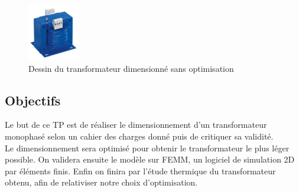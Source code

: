 \begin{figure}[ht]
	\begin{center}
	\includegraphics[width=0.2\textwidth]{images/TP_intro_transfo}
	\caption{Dessin du transformateur dimensionné sans optimisation}\label{img:dessinTransfoCarre}
	\end{center}
\end{figure}
\FloatBarrier 


\subsection{Objectifs}
Le but de ce TP est de réaliser le dimensionnement d'un transformateur monophasé selon un cahier des charges donné puis de critiquer sa validité.\\
Le dimensionnement sera optimisé pour obtenir le transformateur le plus léger possible. On validera ensuite le modèle sur FEMM, un logiciel de simulation 2D par éléments finis. Enfin on finira par l'étude thermique du transformateur obtenu, afin de relativiser notre choix d'optimisation.\\


